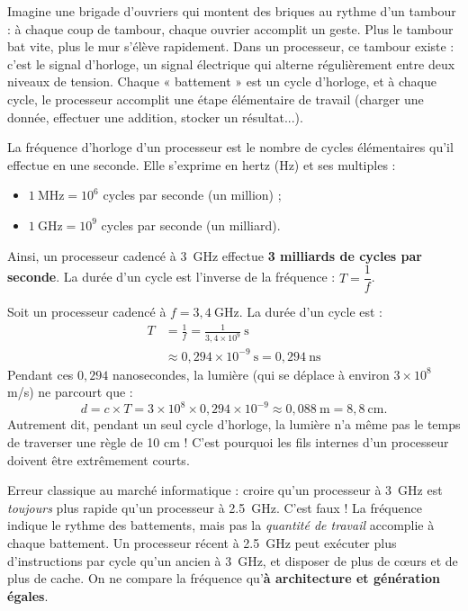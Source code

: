 \documentclass[11pt]{article}
\newcommand{\cle}[1]{{\popxbold\color{popdark}#1}}
\begin{document}
Imagine une brigade d'ouvriers qui montent des briques au rythme d'un tambour : à chaque coup de tambour, chaque ouvrier accomplit un geste. Plus le tambour bat vite, plus le mur s'élève rapidement. Dans un processeur, ce tambour existe : c'est le \cle{signal d'horloge}, un signal électrique qui alterne régulièrement entre deux niveaux de tension. Chaque « battement » est un \cle{cycle d'horloge}, et à chaque cycle, le processeur accomplit une étape élémentaire de travail (charger une donnée, effectuer une addition, stocker un résultat...).

\begin{definition}
La \cle{fréquence d'horloge} d'un processeur est le nombre de \cle{cycles élémentaires} qu'il effectue en une seconde. Elle s'exprime en \cle{hertz} (Hz) et ses multiples :
\begin{itemize}
\item $1~\text{MHz} = 10^{6}$ cycles par seconde (un million) ;
\item $1~\text{GHz} = 10^{9}$ cycles par seconde (un milliard).
\end{itemize}
Ainsi, un processeur cadencé à \SI{3}{GHz} effectue \textbf{3 milliards de cycles par seconde}. La durée d'un cycle est l'inverse de la fréquence : $T = \dfrac{1}{f}$.
\end{definition}

\begin{exemplebox}
Soit un processeur cadencé à $f = 3{,}4~\text{GHz}$. La durée d'un cycle est :
\begin{align*}
T &= \frac{1}{f} = \frac{1}{3{,}4 \times 10^{9}}~\text{s} \\
&\approx 0{,}294 \times 10^{-9}~\text{s} = 0{,}294~\text{ns}
\end{align*}
Pendant ces $0{,}294$ nanosecondes, la lumière (qui se déplace à environ $3 \times 10^{8}$ m/s) ne parcourt que :
\[ d = c \times T = 3 \times 10^{8} \times 0{,}294 \times 10^{-9} \approx 0{,}088~\text{m} = 8{,}8~\text{cm}. \]
Autrement dit, pendant un seul cycle d'horloge, la lumière n'a même pas le temps de traverser une règle de 10 cm ! C'est pourquoi les fils internes d'un processeur doivent être extrêmement courts.
\end{exemplebox}

\begin{attention}
Erreur classique au marché informatique : croire qu'un processeur à \SI{3}{GHz} est \emph{toujours} plus rapide qu'un processeur à \SI{2,5}{GHz}. C'est faux ! La fréquence indique le rythme des battements, mais pas la \emph{quantité de travail} accomplie à chaque battement. Un processeur récent à \SI{2,5}{GHz} peut exécuter plus d'instructions par cycle qu'un ancien à \SI{3}{GHz}, et disposer de plus de cœurs et de plus de cache. On ne compare la fréquence qu'\textbf{à architecture et génération égales}.
\end{attention}
\end{document}
